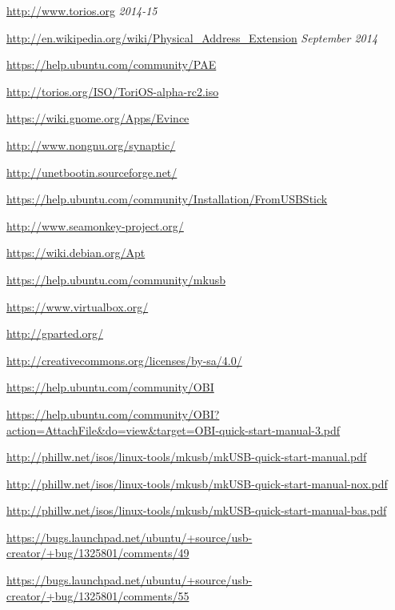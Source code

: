 \documentclass[12pt,a4paper]{book}
\begin{document}
\begin{thebibliography}{1} %

\url{http://www.torios.org}
\emph{2014-15}

\url{http://en.wikipedia.org/wiki/Physical_Address_Extension}
\emph{September 2014}

\url{https://help.ubuntu.com/community/PAE}

\url{http://torios.org/ISO/ToriOS-alpha-rc2.iso}

\url{https://wiki.gnome.org/Apps/Evince}

\url{http://www.nongnu.org/synaptic/}

\url{http://unetbootin.sourceforge.net/}

\url{https://help.ubuntu.com/community/Installation/FromUSBStick}

\url{http://www.seamonkey-project.org/}

\url{https://wiki.debian.org/Apt}

	
\url{https://help.ubuntu.com/community/mkusb}

\url{https://www.virtualbox.org/}

\url{http://gparted.org/}

\url{http://creativecommons.org/licenses/by-sa/4.0/}

\url{https://help.ubuntu.com/community/OBI	}

\url{https://help.ubuntu.com/community/OBI?action=AttachFile&do=view&target=OBI-quick-start-manual-3.pdf}
	
\url{http://phillw.net/isos/linux-tools/mkusb/mkUSB-quick-start-manual.pdf}
	
	
\url{http://phillw.net/isos/linux-tools/mkusb/mkUSB-quick-start-manual-nox.pdf}

\url{http://phillw.net/isos/linux-tools/mkusb/mkUSB-quick-start-manual-bas.pdf}
	
\url{https://bugs.launchpad.net/ubuntu/+source/usb-creator/+bug/1325801/comments/49}

\url{https://bugs.launchpad.net/ubuntu/+source/usb-creator/+bug/1325801/comments/55}		


\end{thebibliography}
\end{document}
